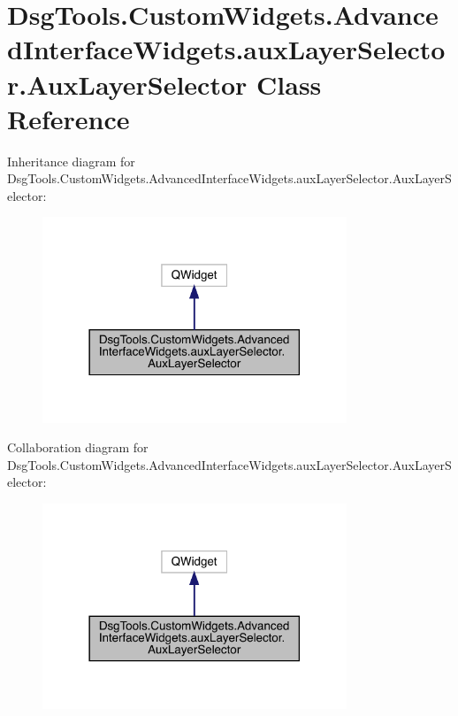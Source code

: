 \hypertarget{class_dsg_tools_1_1_custom_widgets_1_1_advanced_interface_widgets_1_1aux_layer_selector_1_1_aux_layer_selector}{}\section{Dsg\+Tools.\+Custom\+Widgets.\+Advanced\+Interface\+Widgets.\+aux\+Layer\+Selector.\+Aux\+Layer\+Selector Class Reference}
\label{class_dsg_tools_1_1_custom_widgets_1_1_advanced_interface_widgets_1_1aux_layer_selector_1_1_aux_layer_selector}


Inheritance diagram for Dsg\+Tools.\+Custom\+Widgets.\+Advanced\+Interface\+Widgets.\+aux\+Layer\+Selector.\+Aux\+Layer\+Selector\+:
\nopagebreak
\begin{figure}[H]
\begin{center}
\leavevmode
\includegraphics[width=258pt]{class_dsg_tools_1_1_custom_widgets_1_1_advanced_interface_widgets_1_1aux_layer_selector_1_1_aux_layer_selector__inherit__graph}
\end{center}
\end{figure}


Collaboration diagram for Dsg\+Tools.\+Custom\+Widgets.\+Advanced\+Interface\+Widgets.\+aux\+Layer\+Selector.\+Aux\+Layer\+Selector\+:
\nopagebreak
\begin{figure}[H]
\begin{center}
\leavevmode
\includegraphics[width=258pt]{class_dsg_tools_1_1_custom_widgets_1_1_advanced_interface_widgets_1_1aux_layer_selector_1_1_aux_layer_selector__coll__graph}
\end{center}
\end{figure}
